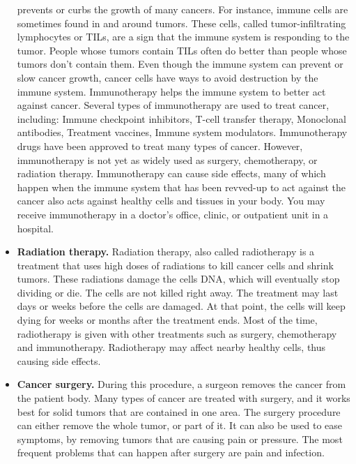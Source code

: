 \begin{itemize}
          prevents or curbs the growth of many cancers. For instance, immune
          cells are sometimes found in and around tumors. These cells, called
          tumor-infiltrating lymphocytes or TILs, are a sign that the immune
          system is responding to the tumor. People whose tumors contain TILs
          often do better than people whose tumors don't contain them. Even
          though the immune system can prevent or slow cancer growth, cancer
          cells have ways to avoid destruction by the immune system.
          Immunotherapy helps the immune system to better act against cancer.
          Several types of immunotherapy are used to treat cancer, including:
          Immune checkpoint inhibitors, T-cell transfer therapy, Monoclonal
          antibodies, Treatment vaccines, Immune system modulators.
          Immunotherapy drugs have been approved to treat many types of cancer.
          However, immunotherapy is not yet as widely used as surgery,
          chemotherapy, or radiation therapy. Immunotherapy can cause side
          effects, many of which happen when the immune system that has been
          revved-up to act against the cancer also acts against healthy cells
          and tissues in your body. You may receive immunotherapy in a doctor's
          office, clinic, or outpatient unit in a hospital.
    \item \textbf{Radiation therapy.} Radiation therapy, also called
          radiotherapy is a treatment that uses high doses of radiations to kill
          cancer cells and shrink tumors. These radiations damage the cells DNA,
          which will eventually stop dividing or die. The cells are not killed
          right away. The treatment may last days or weeks before the cells
          are damaged. At that point, the cells will keep dying for weeks or
          months after the treatment ends. Most of the time, radiotherapy
          is given with other treatments such as surgery, chemotherapy and
          immunotherapy. Radiotherapy may affect nearby healthy cells, thus
          causing side effects.
    \item \textbf{Cancer surgery.} During this procedure, a surgeon removes the
          cancer from the patient body. Many types of cancer are treated with
          surgery, and it works best for solid tumors that are contained in one
          area. The surgery procedure can either remove the whole tumor, or
          part of it. It can also be used to ease symptoms, by removing
          tumors that are causing pain or pressure. The most frequent problems
          that can happen after surgery are pain and infection.

\end{itemize}

